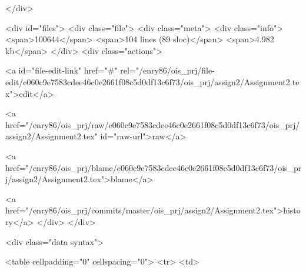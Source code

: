     </div>

    <div id="files">
      <div class="file">
        <div class="meta">
          <div class="info">
            <span>100644</span>
            <span>104 lines (89 sloc)</span>
            <span>4.982 kb</span>
          </div>
          <div class="actions">
            
              <a id="file-edit-link" href="#" rel="/enry86/ois_prj/file-edit/e060c9e7583cdee46c0e2661f08c5d0df13c6f73/ois_prj/assign2/Assignment2.tex">edit</a>
            
            <a href="/enry86/ois_prj/raw/e060c9e7583cdee46c0e2661f08c5d0df13c6f73/ois_prj/assign2/Assignment2.tex" id="raw-url">raw</a>
            
              <a href="/enry86/ois_prj/blame/e060c9e7583cdee46c0e2661f08c5d0df13c6f73/ois_prj/assign2/Assignment2.tex">blame</a>
            
            <a href="/enry86/ois_prj/commits/master/ois_prj/assign2/Assignment2.tex">history</a>
          </div>
        </div>
        
  <div class="data syntax">
    
      <table cellpadding="0" cellspacing="0">
        <tr>
          <td>
            
